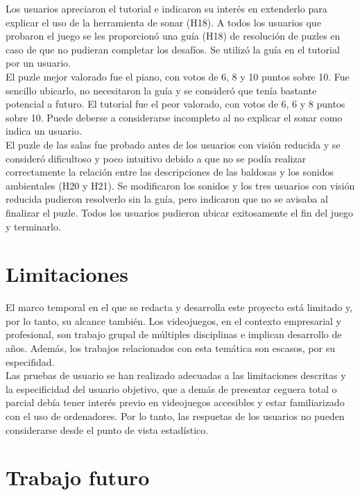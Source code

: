 Los usuarios apreciaron el tutorial e indicaron su interés en extenderlo para explicar el uso de la herramienta de sonar (H18). A todos los usuarios que probaron el juego se les proporcionó una guía (H18) de resolución de puzles en caso de que no pudieran completar los desafíos. Se utilizó la guía en el tutorial por un usuario. \\

El puzle mejor valorado fue el piano, con votos de 6, 8 y 10 puntos sobre 10. Fue sencillo ubicarlo, no necesitaron la guía y se consideró que tenía bastante potencial a futuro. El tutorial fue el peor valorado, con votos de 6, 6 y 8 puntos sobre 10. Puede deberse a considerarse incompleto al no explicar el sonar como indica un usuario.\\

El puzle de las salas fue probado antes de los usuarios con visión reducida y se consideró dificultoso y poco intuitivo debido a que no se podía realizar correctamente la relación entre las descripciones de las baldosas y los sonidos ambientales (H20 y H21). Se modificaron los sonidos y los tres usuarios con visión reducida pudieron resolverlo sin la guía, pero indicaron que no se avisaba al finalizar el puzle. Todos los usuarios pudieron ubicar exitosamente el fin del juego y terminarlo.\\


\section{Limitaciones}

El marco temporal en el que se redacta y desarrolla este proyecto está limitado y, por lo tanto, su alcance también. Los videojuegos, en el contexto empresarial y profesional, son trabajo grupal de múltiples disciplinas e implican desarrollo de años. Además, los trabajos relacionados con esta temática son escasos, por su especifidad. \\

Las pruebas de usuario se han realizado adecuadas a las limitaciones descritas y la especificidad del usuario objetivo, que a demás de presentar ceguera total o parcial debía tener interés previo en videojuegos accesibles y estar familiarizado con el uso de ordenadores. Por lo tanto, las respuetas de los usuarios no pueden considerarse desde el punto de vista estadístico.
\section{Trabajo futuro}


